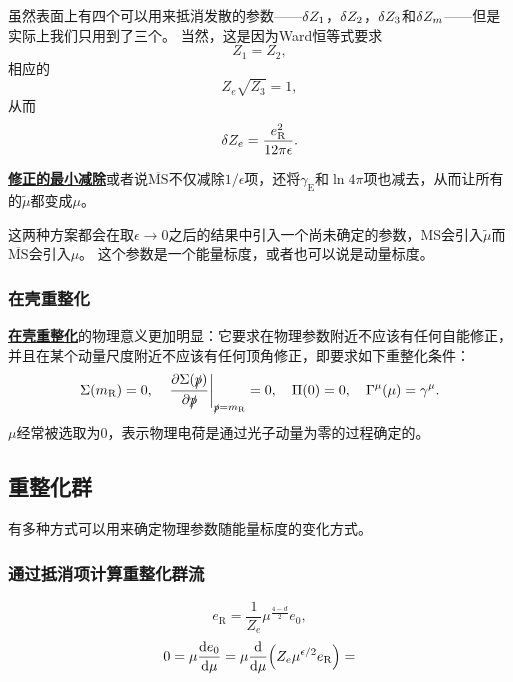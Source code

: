 \documentclass[hyperref, UTF8, a4paper]{ctexart}
\newcommand{\concept}[1]{\underline{\textbf{#1}}}
\begin{document}
虽然表面上有四个可以用来抵消发散的参数——$\var{Z_1}$，$\var{Z_2}$，$\var{Z_3}$和$\var{Z_m}$——但是实际上我们只用到了三个。
当然，这是因为Ward恒等式要求
\[
    Z_1 = Z_2,
\]
相应的
\begin{equation}
    Z_e \sqrt{Z_3} = 1,
\end{equation}
从而
\begin{equation}
    \var{Z_e} = \frac{e_\text{R}^2}{12 \pi \epsilon}.
\end{equation}

\concept{修正的最小减除}或者说$\overline{\mathrm{MS}}$不仅减除$1/\epsilon$项，还将$\gamma_\text{E}$和$\ln 4\pi$项也减去，从而让所有的$\tilde{\mu}$都变成$\mu$。

这两种方案都会在取$\epsilon \to 0$之后的结果中引入一个尚未确定的参数，MS会引入$\tilde{\mu}$而$\overline{\mathrm{MS}}$会引入$\mu$。
这个参数是一个能量标度，或者也可以说是动量标度。

\subsubsection{在壳重整化}

\concept{在壳重整化}的物理意义更加明显：它要求在物理参数附近不应该有任何自能修正，并且在某个动量尺度附近不应该有任何顶角修正，即要求如下重整化条件：
\begin{equation}
    \Sigma(m_\text{R}) = 0, \quad \eval{\pdv{\Sigma(\slashed{p})}{\slashed{p}}}_{\slashed{p} = m_\text{R}} = 0, \quad \Pi(0) = 0, \quad \Gamma^\mu(\mu) = \gamma^\mu.
\end{equation}
$\mu$经常被选取为$0$，表示物理电荷是通过光子动量为零的过程确定的。

\subsection{重整化群}

有多种方式可以用来确定物理参数随能量标度的变化方式。

\subsubsection{通过抵消项计算重整化群流}

\begin{equation}
    e_\text{R} = \frac{1}{Z_e} \mu^{\frac{4-d}{2}} e_0,
\end{equation}
\[
    0 = \mu \dv{e_0}{\mu} = \mu \dv{\mu} (Z_e \mu^{\epsilon / 2} e_\text{R}) = 
\]
\end{document}
